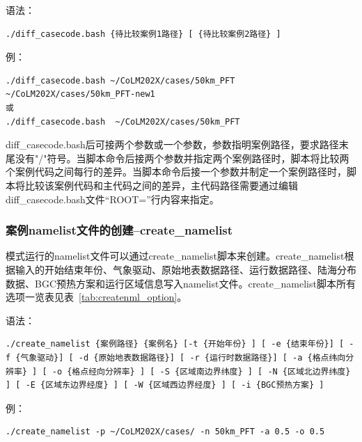 语法：

\begin{lstlisting}
./diff_casecode.bash {待比较案例1路径} [ {待比较案例2路径} ]
\end{lstlisting}

例：
\begin{lstlisting}
./diff_casecode.bash ~/CoLM202X/cases/50km_PFT ~/CoLM202X/cases/50km_PFT-new1
或
./diff_casecode.bash  ~/CoLM202X/cases/50km_PFT
\end{lstlisting}

diff\_casecode.bash后可接两个参数或一个参数，参数指明案例路径，要求路径末尾没有"/"符号。当脚本命令后接两个参数并指定两个案例路径时，脚本将比较两个案例代码之间每行的差异。当脚本命令后接一个参数并制定一个案例路径时，脚本将比较该案例代码和主代码之间的差异，主代码路径需要通过编辑diff\_casecode.bash文件“ROOT=”行内容来指定。

\subsubsection{案例namelist文件的创建--create\_namelist}

模式运行的namelist文件可以通过create\_namelist脚本来创建。create\_namelist根据输入的开始结束年份、气象驱动、原始地表数据路径、运行数据路径、陆海分布数据、BGC预热方案和运行区域信息写入namelist文件。create\_namelist脚本所有选项一览表见表~\ref{tab:createnml_option}。

语法：
\begin{lstlisting}
./create_namelist {案例路径} {案例名} [-t {开始年份} ] [ -e {结束年份}] [ -f {气象驱动}] [ -d {原始地表数据路径}] [ -r {运行时数据路径}] [ -a {格点纬向分辨率} ] [ -o {格点经向分辨率} ] [ -S {区域南边界纬度} ] [ -N {区域北边界纬度} ] [ -E {区域东边界经度} ] [ -W {区域西边界经度} ] [ -i {BGC预热方案} ]
\end{lstlisting}

例：
\begin{lstlisting}
./create_namelist -p ~/CoLM202X/cases/ -n 50km_PFT -a 0.5 -o 0.5
\end{lstlisting}

